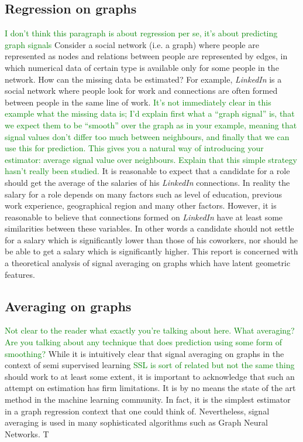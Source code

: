 \documentclass{article}
\newcommand\SB[1]{\textcolor{green}{#1}}
\begin{document}
\subsection{Regression on graphs}
\SB{I don't think this paragraph is about regression per se, it's about
  predicting graph signals}
Consider a social network (i.e. a graph) where people are represented as nodes
and relations between people are represented by edges, in which numerical data
of certain type is available only for some people in the network. How can the
missing data be estimated? For example, \textit{LinkedIn} is a social network
where people look for work and connections are often formed between people in
the same line of work.
\SB{It's not immediately clear in this example what the missing data is; I'd
  explain first what a ``graph signal'' is, that we expect them to be ``smooth''
over the graph as in your example, meaning that signal values don't differ too
much between neighbours, and finally that we can use this for prediction. This
gives you a natural way of introducing your estimator: average signal value over
neighbours.
Explain that this simple strategy hasn't really been studied. 
}
It is reasonable to expect that a candidate for a role should get the average of the salaries of his \textit{LinkedIn} connections. In reality the salary for a role depends on many factors such as level of education, previous work experience, geographical region and many other factors. However, it is reasonable to believe that connections formed on \textit{LinkedIn} have at least some similarities between these variables. In other words a candidate should not settle for a salary which is significantly lower than those of his coworkers, nor should he be able to get a salary which is significantly higher. This report is concerned with a theoretical analysis of  signal averaging on graphs which have latent 
geometric features.

\subsection{Averaging on graphs}
\SB{Not clear to the reader what exactly you're talking about here. What
  averaging? Are you talking about any technique that does prediction using some
  form of  smoothing? }
While it is intuitively clear that signal averaging on graphs in the context of
semi supervised learning \SB{SSL is sort of related but not the same thing} should work to at least some extent, it is important to acknowledge that such an attempt on estimation has firm limitations. It is by no means the state of the art method in the machine learning community. In fact, it is the simplest estimator in a graph regression context that one could think of. Nevertheless, signal averaging is used in many sophisticated algorithms such as Graph Neural Networks. T
\end{document}
